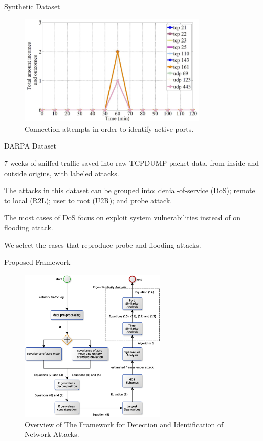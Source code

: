 \documentclass[newPxFont, numfooter, sectionpages]{beamer}
\begin{document}
\begin{frame}[c]{Synthetic Dataset}
	
	\begin{figure}[h!]
	     \centering 
	     \includegraphics[width=9cm]{../figures/fig07.png}
	     \caption{Connection attempts in order to identify active ports.}
	     \label{fig:2_fig7}
	\end{figure}

\end{frame}
\begin{frame}{DARPA Dataset}
	
	7 weeks of sniffed traffic saved into raw TCPDUMP packet data, from inside and outside origins, with labeled attacks. 

	The attacks in this dataset can be grouped into: denial-of-service (DoS); remote to local (R2L); user to root (U2R); and probe attack. 

	The most cases of DoS focus on exploit system vulnerabilities instead of on flooding attack. 

	We select the cases that reproduce probe and flooding attacks.

\end{frame}
\begin{frame}{Proposed Framework}
	
	\begin{figure}[h!]
		\centering
	     \includegraphics[width=7cm]{../figures/mos_eigen_similarity.eps}
	     \caption{Overview of The Framework for Detection and Identification of Network Attacks.}
	     \label{fig:2_fig80}
	\end{figure}

\end{frame}
\end{document}

